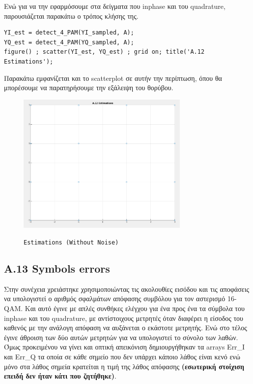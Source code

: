 \documentclass[11pt]{article}
\begin{document}
    \par \noindent
    Ενώ για να την εφαρμόσουμε στα δείγματα που inphase και του quadrature, παρουσιάζεται παρακάτω ο τρόπος κλήσης της.
    
    \begin{lstlisting}[caption = {A.12 \texttt{Setect Symbols}}]
% A.12
YI_est = detect_4_PAM(YI_sampled, A); 
YQ_est = detect_4_PAM(YQ_sampled, A); 
figure() ; scatter(YI_est, YQ_est) ; grid on; title('A.12 Estimations');
    \end{lstlisting}
    
    \par \noindent
    Παρακάτω εμφανίζεται και το scatterplot σε αυτήν την περίπτωση, όπου θα μπορέσουμε να παρατηρήσουμε την εξάλειψη του θορύβου.
    
    \begin{figure}[H]
        \centering
        \includegraphics[scale=0.5, width=0.75\textwidth]{img/A12_without_noise.png} \\
        \caption{\texttt{Estimations (Without Noise)}}
    \end{figure}
    
    \subsection*{A.13 Symbols errors}
    Στην συνέχεια χρειάστηκε χρησιμοποιώντας τις ακολουθίες εισόδου και τις αποφάσεις να υπολογιστεί ο αριθμός σφαλμάτων απόφασης συμβόλου για τον αστερισμό 16-QAM.
    Και αυτό έγινε με απλές συνθήκες ελέγχου για ένα προς ένα τα σύμβολα του inphase και του quadrature, με αντίστοιχους μετρητές όταν διαφέρει η είσοδος του καθενός με την ανάλογη απόφαση να αυξάνεται ο εκάστοτε μετρητής. 
    Ενώ στο τέλος έγινε άθροιση των δύο αυτών μετρητών για να υπολογιστεί το σύνολο των λαθών. 
    Όμως προκειμένου να γίνει και οπτική απεικόνιση δημιουργήθηκαν τα arrays Err\_I και Err\_Q τα οποία σε κάθε σημείο που δεν υπάρχει κάποιο λάθος είναι κενό ενώ μόνο στα λάθος σημεία κρατείται η τιμή της λάθος απόφασης \textbf{(εσωτερική στοίχιση επειδή δεν ήταν κάτι που ζητήθηκε)}.
    
\end{document}
